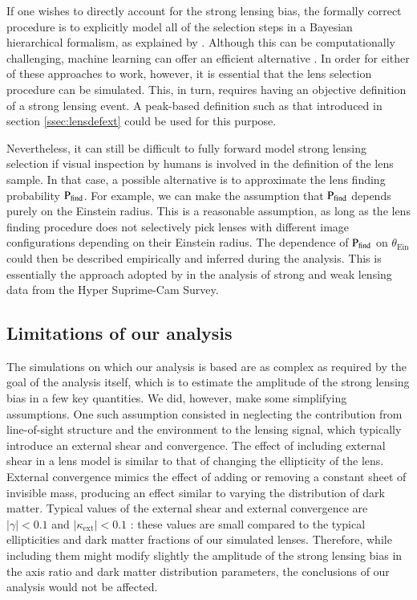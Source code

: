\documentclass{aa}
\def\tein{\theta_{\mathrm{Ein}}}
\def\pfind{{\rm P}_\mathrm{find}}
\begin{document}
If one wishes to directly account for the strong lensing bias, the formally correct procedure is to explicitly model all of the selection steps in a Bayesian hierarchical formalism, as explained by \citet{Son22}.
Although this can be computationally challenging, machine learning can offer an efficient alternative \citep{Leg++22}.
In order for either of these approaches to work, however, it is essential that the lens selection procedure can be simulated.
This, in turn, requires having an objective definition of a strong lensing event. A peak-based definition such as that introduced in section \ref{ssec:lensdefext} could be used for this purpose.

Nevertheless, it can still be difficult to fully forward model strong lensing selection if visual inspection by humans is involved in the definition of the lens sample.
In that case, a possible alternative is to approximate the lens finding probability $\pfind$. 
For example, we can make the assumption that $\pfind$ depends purely on the Einstein radius.
This is a reasonable assumption, as long as the lens finding procedure does not selectively pick lenses with different image configurations depending on their Einstein radius.
The dependence of $\pfind$ on $\tein$ could then be described empirically and inferred during the analysis.
This is essentially the approach adopted by \citet{Son++19} in the analysis of strong and weak lensing data from the Hyper Suprime-Cam Survey.


\subsection{Limitations of our analysis}\label{ssec:limitations}

The simulations on which our analysis is based are as complex as required by the goal of the analysis itself, which is to estimate the amplitude of the strong lensing bias in a few key quantities.
We did, however, make some simplifying assumptions.
One such assumption consisted in neglecting the contribution from line-of-sight structure and the environment to the lensing signal, which typically introduce an external shear and convergence.
The effect of including external shear in a lens model is similar to that of changing the ellipticity of the lens. 
External convergence mimics the effect of adding or removing a constant sheet of invisible mass, producing an effect similar to varying the distribution of dark matter.
Typical values of the external shear and external convergence are $|\gamma|<0.1$ and $|\kappa_{\mathrm{ext}}|<0.1$ \citep{Mil++20}: these values are small compared to the typical ellipticities and dark matter fractions of our simulated lenses.
Therefore, while including them might modify slightly the amplitude of the strong lensing bias in the axis ratio and dark matter distribution parameters, the conclusions of our analysis would not be affected.
\end{document}
